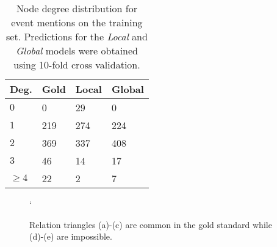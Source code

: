 \begin{table}[t]
{\small
\hfill{}
\begin{tabular}{ l | l | l | l }
\textbf{Deg.} &\textbf{Gold}&\textbf{Local} & \textbf{Global}\\
\hline
$0$            &     0        &    29       &   0 \\ 
$1$            &     219        &    274       & 224  \\ 
$2$            &     369        &    337       &  408  \\ 
$3$            &     46        &     14     &  17 \\ 
$\geq4$           &     22        &     2      &  7 
\end{tabular}}
\hfill{}
\caption{Node degree distribution for event mentions on the training set. Predictions for the \emph{Local} and \emph{Global} models were obtained using 10-fold cross validation.}
\label{tab:degree}
\end{table}

\begin{figure*}[ht]
  \begin{center}
      
  \end{center}
  \caption{Relation triangles (a)-(c) are common in the gold standard while (d)-(e) are impossible.}`
  \label{fig:triad}
\end{figure*}






















